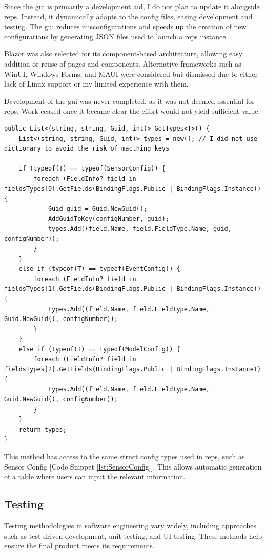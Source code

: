 		Since the \gls{gui} is primarily a development aid, I do not plan to update it alongside \gls{reps}. Instead, it dynamically adapts to the config files, easing development and testing. The \gls{gui} reduces misconfigurations and speeds up the creation of new configurations by generating JSON files used to launch a \gls{reps} instance.
		
		Blazor was also selected for its component-based architecture, allowing easy addition or reuse of pages and components. Alternative frameworks such as WinUI, Windows Forms, and MAUI were considered but dismissed due to either lack of Linux support or my limited experience with them.
		
		
		Development of the \gls{gui} was never completed, as it was not deemed essential for \gls{reps}. Work ceased once it became clear the effort would not yield sufficient value.
		\begin{lstlisting}[language={[sharp]C},caption={JSON.razor},label=lst:GUITypeDetermination]
public List<(string, string, Guid, int)> GetTypes<T>() {
	List<(string, string, Guid, int)> types = new(); // I did not use dictionary to avoid the risk of macthing keys
	
	if (typeof(T) == typeof(SensorConfig)) {
		foreach (FieldInfo? field in fieldsTypes[0].GetFields(BindingFlags.Public | BindingFlags.Instance)) {
			Guid guid = Guid.NewGuid();
			AddGuidToKey(configNumber, guid);
			types.Add((field.Name, field.FieldType.Name, guid, configNumber));
		}
	}
	else if (typeof(T) == typeof(EventConfig)) {
		foreach (FieldInfo? field in fieldsTypes[1].GetFields(BindingFlags.Public | BindingFlags.Instance)) {
			types.Add((field.Name, field.FieldType.Name, Guid.NewGuid(), configNumber));
		}
	}
	else if (typeof(T) == typeof(ModelConfig)) {
		foreach (FieldInfo? field in fieldsTypes[2].GetFields(BindingFlags.Public | BindingFlags.Instance)) {
			types.Add((field.Name, field.FieldType.Name, Guid.NewGuid(), configNumber));
		}
	}
	return types;
}
		\end{lstlisting}
		This method has access to the same struct config types used in \gls{reps}, such as Sensor Config [Code Snippet \ref{lst:SensorConfig}]. This allows automatic generation of a table where users can input the relevant information.
		
		
	\subsection{Testing}
		Testing methodologies in software engineering vary widely, including approaches such as test-driven development, unit testing, and UI testing. These methods help ensure the final product meets its requirements. 
		
